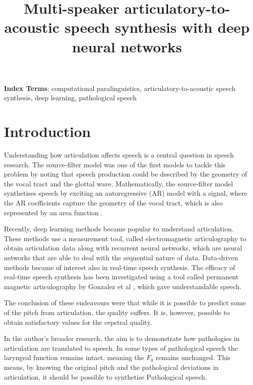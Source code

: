 \documentclass[a4paper]{article}
\title{Multi-speaker articulatory-to-acoustic speech synthesis with
deep neural networks}
\begin{document}
\maketitle
% 
\begin{abstract}
  \blindtext[1]
\end{abstract}
\noindent\textbf{Index Terms}: computational paralinguistics, articulatory-to-acoustic
speech synthesis, deep learning, pathological speech

\section{Introduction}

Understanding how articulation affects speech is a central question in speech
research. The source-filter model was one of the first models to tackle this
problem by noting that speech production could be described by
the geometry of the vocal tract and the glottal wave. Mathematically,
the source-filter model synthetises speech by exciting an autoregressive (AR) model with a
signal, where the AR coefficients capture the geometry of the
vocal tract, which is also represented by an area function \cite{Benesty2009}. 

Recently, deep learning methods became popular
to understand articulation. These methods use a measurement tool,
called electromagnetic articulography to obtain articulation data 
\cite{Aryal2016} \cite{Taguchi} \cite{Liu2018} along with recurrent
neural networks, which are neural networks that are able to deal with
the sequential nature of data. Data-driven methods became of interest also
in real-time speech synthesis. The efficacy of real-time speech synthesis
has been investigated using a tool called permanent magnetic articulography
by Gonzalez et al \cite{Gonzalez2017}, which gave understandable
speech.

The conclusion of these endeavours were that while it is possible to
predict some of the pitch from articulation, the quality suffers.
It is, however, possible to obtain satisfactory values for the
cepstral quality.

In the author's broader research, the aim is to demonstrate how pathologies in
articulation are translated to speech. In some types of pathological
speech the laryngeal function remains intact, meaning the \( F_0 \)
remains unchanged. This means, by knowing the original pitch and the
pathological deviations in articulation, it should be possible to
synthetise Pathological speech.
\end{document}
